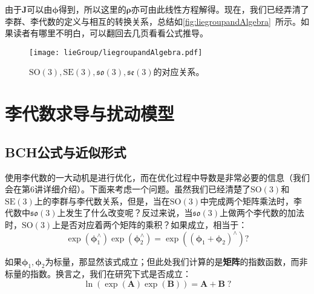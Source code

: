 由于$\bm{J}$可以由$\bm{\phi}$得到，所以这里的$\bm{\rho}$亦可由此线性方程解得。现在，我们已经弄清了李群、李代数的定义与相互的转换关系，总结如\autoref{fig:liegroupandAlgebra}~所示。如果读者有哪里不明白，可以翻回去几页看看公式推导。

\begin{figure}[!ht]
	\centering
	\texttt{[image: lieGroup/liegroupandAlgebra.pdf]}
	\caption{$\mathrm{SO}(3),\mathrm{SE}(3),\mathfrak{so}(3), \mathfrak{se}(3)$的对应关系。}
	\label{fig:liegroupandAlgebra}
\end{figure}

\clearpage

\section{李代数求导与扰动模型}
\subsection{BCH公式与近似形式}
使用李代数的一大动机是进行优化，而在优化过程中导数是非常必要的信息（我们会在第6讲详细介绍）。下面来考虑一个问题。虽然我们已经清楚了$\mathrm{SO}(3)$和$\mathrm{SE}(3)$上的李群与李代数关系，但是，当在$\mathrm{SO}(3)$中完成两个矩阵乘法时，李代数中$\mathfrak{so}(3)$上发生了什么改变呢？反过来说，当$\mathfrak{so}(3)$上做两个李代数的加法时，$\mathrm{SO}(3)$上是否对应着两个矩阵的乘积？如果成立，相当于：
\[
\exp \left( {\bm{\phi} _1^ \wedge } \right)\exp \left( {\bm{\phi} _2^ \wedge } \right) = \exp \left( {{{\left( {{\bm{\phi} _1} + {\bm{\phi} _2}} \right)}^ \wedge }} \right) ?
\]

如果$\bm{\phi}_1, \bm{\phi}_2$为标量，那显然该式成立；但此处我们计算的是\textbf{矩阵}的指数函数，而非标量的指数。换言之，我们在研究下式是否成立：
\[
	\ln \left( \exp \left( \bm{A} \right) \exp \left( \bm{B} \right) \right) = \bm{A} + \bm{B} \; ?
\]

